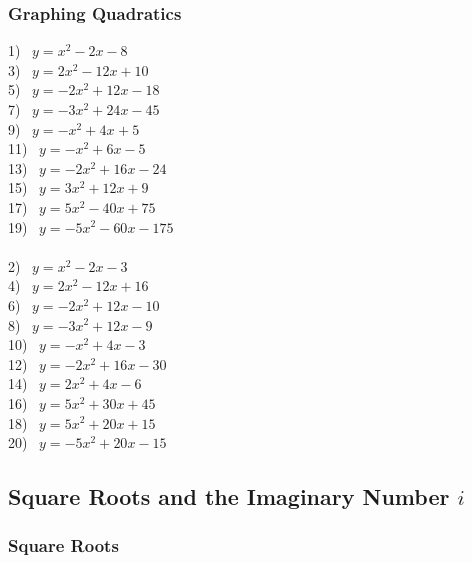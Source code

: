 \subsubsection{Graphing Quadratics}

{}

\begin{multicols}{2}
  1)~ $y = x^2 - 2 x - 8$\\
  3)~ $y = 2 x^2 - 12 x + 10$\\
  5)~ $y = - 2 x^2 + 12 x - 18$\\
  7)~ $y = - 3 x^2 + 24 x - 45$\\
  9)~ $y = - x^2 + 4 x_{} + 5$\\
  11)~ $y = - x^2 + 6 x - 5$\\
  13)~ $y = - 2 x^2 + 16 x - 24$\\
  15)~ $y = 3 x^2 + 12 x + 9$\\
  17)~ $y = 5 x^2 - 40 x + 75$\\
  19)~ $y = - 5 x^2 - 60 x - 175$\\
~\\
  2)~ $y = x^2 - 2 x - 3$\\
  4)~ $y = 2 x^2 - 12 x + 16$\\
  6)~ $y = - 2 x^2 + 12 x - 10$\\
  8)~ $y = - 3 x^2 + 12 x - 9$\\
  10)~ $y = - x^2 + 4 x - 3$\\
  12)~ $y = - 2 x^2 + 16 x - 30$\\
  14)~ $y = 2 x^2 + 4 x - 6$\\
  16)~ $y = 5 x^2 + 30 x + 45$\\
  18)~ $y = 5 x^2 + 20 x + 15$\\
  20)~ $y = - 5 x^2 + 20 x - 15$\\
\end{multicols}

\newpage

\subsection{Square Roots and the Imaginary Number $i$}

\subsubsection{Square Roots}

{}%

